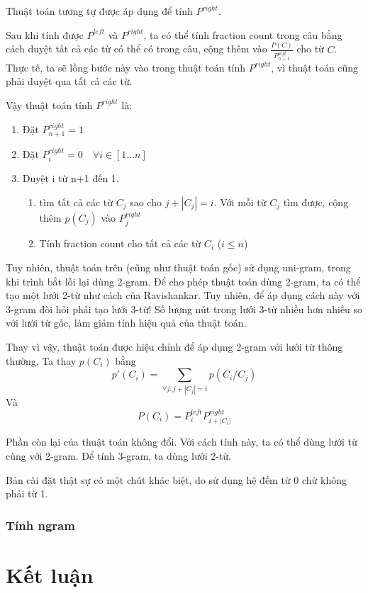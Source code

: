 \documentclass[a4paper]{book}
\begin{document}
Thuật toán tương tự được áp dụng để tính $P^{right}$.

Sau khi tính được $P^{left}$ và $P^{right}$, ta có thể tính fraction
count trong câu bằng cách duyệt tất cả các từ có thể có trong câu,
cộng thêm vào $\displaystyle\frac{P(C)}{P_{n+1}^{left}}$ cho từ
$C$. Thực tế, ta sẽ lồng bước này vào trong thuật toán tính
$P^{right}$, vì thuật toán cũng phải duyệt qua tất cả các từ.

Vậy thuật toán tính $P^{right}$ là:
\begin{enumerate}
\item Đặt $P_{n+1}^{right} = 1$
\item Đặt $P_i^{right} = 0\quad \forall i \in [1\ldots n]$
\item Duyệt i từ n+1 đến 1.
  \begin{enumerate}
  \item tìm tất cả các từ $C_j$ sao cho $j+|C_j|=i$.
    Với mỗi từ $C_j$ tìm được, cộng thêm $p(C_j)$ vào
    $P_j^{right}$
  \item Tính fraction count cho tất cả các từ $C_i$ ($i \le n$)
  \end{enumerate}
\end{enumerate}

Tuy nhiên, thuật toán trên (cũng như thuật toán gốc) sử dụng
uni-gram, trong khi trình bắt lỗi lại dùng 2-gram. Để cho phép thuật
toán dùng 2-gram, ta có thể tạo một lưới 2-từ như cách của
Ravishankar. Tuy nhiên, để áp dụng cách này với 3-gram đòi hỏi phải
tạo lưới 3-từ! Số lượng nút trong lưới 3-từ nhiều hơn nhiều so với
lưới từ gốc, làm giảm tính hiệu quả của thuật toán.

Thay vì vậy, thuật toán được hiệu chỉnh để áp dụng 2-gram với lưới từ
thông thường. Ta thay $p(C_i)$ bằng 
$$p'(C_i)=\sum_{\forall j, j+|C_j|=i}p(C_i/C_j)$$
Và
$$P(C_i) = P_{i}^{left}P_{i+|C_i|}^{right}$$

Phần còn lại của thuật toán không đổi. Với cách tính này, ta có thể
dùng lưới từ cùng với 2-gram. Để tính 3-gram, ta dùng lưới 2-từ.

Bản cài đặt thật sự có một chút khác biệt, do sử dụng hệ đếm từ 0 chứ
không phải từ 1.

\subsection{Tính ngram}





\chapter{Kết luận}
\label{cha:conclusion}
\end{document}
